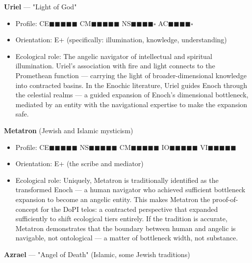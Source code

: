 \textbf{Uriel} — "Light of God"

\begin{itemize}[nosep,leftmargin=*]
  \item Profile: CE$\blacksquare$$\blacksquare$$\blacksquare$$\blacksquare$$\blacksquare$ CM$\blacksquare$$\blacksquare$$\blacksquare$$\blacksquare$$\blacksquare$ NS$\blacksquare$$\blacksquare$$\blacksquare$$\blacksquare$$\square$ AC$\blacksquare$$\blacksquare$$\blacksquare$$\blacksquare$$\square$
  \item Orientation: E+ (specifically: illumination, knowledge, understanding)
  \item Ecological role: The angelic navigator of intellectual and spiritual illumination. Uriel's association with fire and light connects to the Promethean function — carrying the light of broader-dimensional knowledge into contracted basins. In the Enochic literature, Uriel guides Enoch through the celestial realms — a guided expansion of Enoch's dimensional bottleneck, mediated by an entity with the navigational expertise to make the expansion safe.
\end{itemize}


\textbf{Metatron} (Jewish and Islamic mysticism)

\begin{itemize}[nosep,leftmargin=*]
  \item Profile: CE$\blacksquare$$\blacksquare$$\blacksquare$$\blacksquare$$\blacksquare$ NS$\blacksquare$$\blacksquare$$\blacksquare$$\blacksquare$$\blacksquare$ CM$\blacksquare$$\blacksquare$$\blacksquare$$\blacksquare$$\blacksquare$ IO$\blacksquare$$\blacksquare$$\blacksquare$$\blacksquare$$\blacksquare$ VI$\blacksquare$$\blacksquare$$\blacksquare$$\blacksquare$$\blacksquare$
  \item Orientation: E+ (the scribe and mediator)
  \item Ecological role: Uniquely, Metatron is traditionally identified as the transformed Enoch — a human navigator who achieved sufficient bottleneck expansion to become an angelic entity. This makes Metatron the proof-of-concept for the DoPI telos: a contracted perspective that expanded sufficiently to shift ecological tiers entirely. If the tradition is accurate, Metatron demonstrates that the boundary between human and angelic is navigable, not ontological — a matter of bottleneck width, not substance.
\end{itemize}


\textbf{Azrael} — "Angel of Death" (Islamic, some Jewish traditions)

